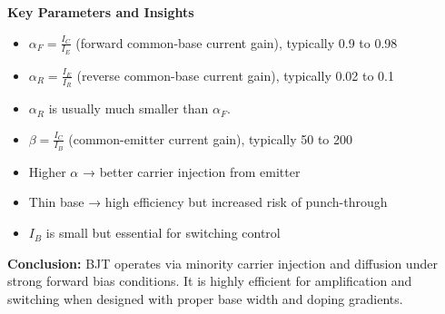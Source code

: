 \begin{frame}{\textbf{Key Parameters and Insights}}
\begin{itemize}
    \item $\alpha_F = \frac{I_C}{I_E}$ (forward common-base current gain), typically 0.9 to 0.98
    \item $\alpha_R = \frac{I_E}{I_R}$ (reverse common-base current gain), typically 0.02 to 0.1
    \item $\alpha_R$ is usually much smaller than $\alpha_F$.
    \item $\beta = \frac{I_C}{I_B}$ (common-emitter current gain), typically 50 to 200
    \item Higher $\alpha$ → better carrier injection from emitter
    \item Thin base → high efficiency but increased risk of punch-through
    \item $I_B$ is small but essential for switching control
\end{itemize}
\vspace{0.5em}
\textbf{Conclusion:} BJT operates via minority carrier injection and diffusion under strong forward bias conditions. It is highly efficient for amplification and switching when designed with proper base width and doping gradients.
\end{frame}


